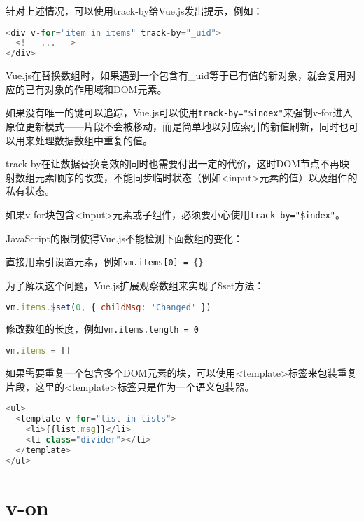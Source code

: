 针对上述情况，可以使用track-by给Vue.js发出提示，例如：

\begin{lstlisting}[language=JavaScript]
<div v-for="item in items" track-by="_uid">
  <!-- ... -->
</div>
\end{lstlisting}

Vue.js在替换数组时，如果遇到一个包含有\_uid等于已有值的新对象，就会复用对应的已有对象的作用域和DOM元素。

如果没有唯一的键可以追踪，Vue.js可以使用\texttt{track-by="\$index"}来强制v-for进入原位更新模式——片段不会被移动，而是简单地以对应索引的新值刷新，同时也可以用来处理数据数组中重复的值。

track-by在让数据替换高效的同时也需要付出一定的代价，这时DOM节点不再映射数组元素顺序的改变，不能同步临时状态（例如<input>元素的值）以及组件的私有状态。


如果v-for块包含<input>元素或子组件，必须要小心使用\texttt{track-by="\$index"}。

JavaScript的限制使得Vue.js不能检测下面数组的变化：

\begin{compactitem}
\item 直接用索引设置元素，例如\texttt{vm.items[0] = \{\}}

为了解决这个问题，Vue.js扩展观察数组来实现了\$set方法：

\begin{lstlisting}[language=JavaScript]
vm.items.$set(0, { childMsg: 'Changed' })
\end{lstlisting}

\item 修改数组的长度，例如\texttt{vm.items.length = 0}

\begin{lstlisting}[language=JavaScript]
vm.items = []
\end{lstlisting}

\end{compactitem}

如果需要重复一个包含多个DOM元素的块，可以使用<template>标签来包装重复片段，这里的<template>标签只是作为一个语义包装器。

\begin{lstlisting}[language=JavaScript]
<ul>
  <template v-for="list in lists">
    <li>{{list.msg}}</li>
    <li class="divider"></li>
  </template>
</ul>
\end{lstlisting}


\section{v-on}

